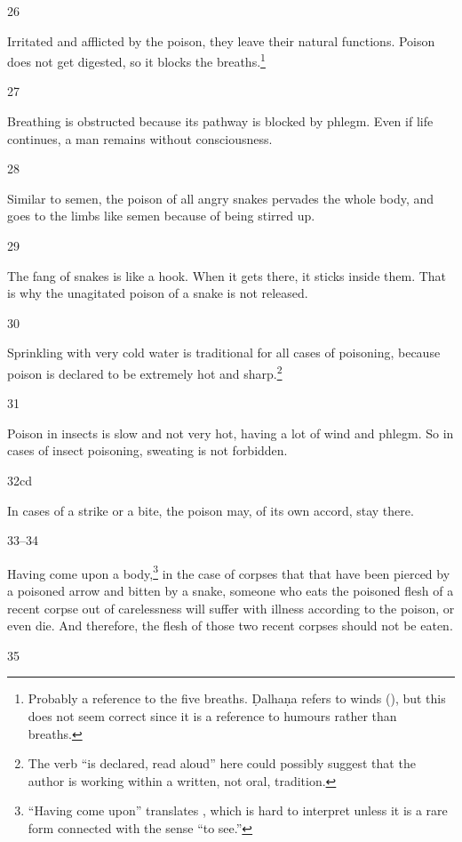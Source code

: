 \begin{translation}[resume]
\item[26]

Irritated and afflicted by the poison, they leave their natural functions.
Poison does not get digested, so it blocks the breaths.\footnote{Probably a
    reference to the five breaths.  Ḍalhaṇa refers to winds (), but this
    does not seem correct since it is a reference to humours rather than breaths.}

\item[27] 

Breathing is obstructed because its pathway is blocked by phlegm. Even
if life continues, a man remains without consciousness.

\item [28]

Similar to semen, the poison of all angry snakes pervades the whole body, and goes 
to the limbs like semen because of being stirred up. 


\item [29]

The fang of snakes is like a hook.  When it gets there, it sticks inside them. That
is why the unagitated poison of a snake is not released.

\item [30] 

Sprinkling with very cold water is traditional for all cases of poisoning,
because poison is declared to be extremely hot and sharp.\footnote{The verb
     “is declared, read aloud” here could possibly suggest that the
    author is working within a written, not oral, tradition.}

\item [31]

Poison in insects is slow and not very hot, having a lot of wind and phlegm. 
So in cases of insect poisoning, sweating is not forbidden.

\item [32cd]

In cases of a strike or a bite, the poison may, of its own accord, stay there. 

\item[33--34]

\dag Having come upon a body,\footnote{“Having come upon” translates
  , which is hard to interpret unless it is a rare form
  connected with the sense “to see.”} in the case of corpses that 
that have been pierced by a poisoned arrow and bitten by a snake,
%
someone who eats the poisoned flesh of a recent corpse out of carelessness 
will suffer with illness according to the poison, or even die. 
%
And therefore, the flesh of those two recent corpses should not be eaten. 

\item[35]


\end{translation}